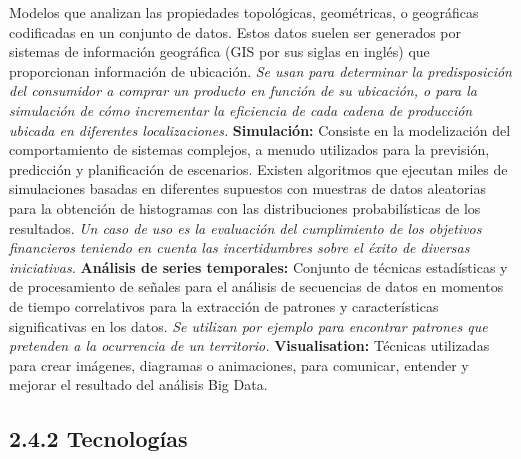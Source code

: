 \documentclass[
  letterpaper,
  DIV=11,
  numbers=noendperiod]{scrreprt}
\begin{document}
Modelos que analizan las propiedades topológicas, geométricas, o
geográficas codificadas en un conjunto de datos. Estos datos suelen ser
generados por sistemas de información geográfica (GIS por sus siglas en
inglés) que proporcionan información de ubicación. \emph{Se usan para
determinar la predisposición del consumidor a comprar un producto en
función de su ubicación, o para la simulación de cómo incrementar la
eficiencia de cada cadena de producción ubicada en diferentes
localizaciones.} \textbf{Simulación:} Consiste en la modelización del
comportamiento de sistemas complejos, a menudo utilizados para la
previsión, predicción y planificación de escenarios. Existen algoritmos
que ejecutan miles de simulaciones basadas en diferentes supuestos con
muestras de datos aleatorias para la obtención de histogramas con las
distribuciones probabilísticas de los resultados. \emph{Un caso de uso
es la evaluación del cumplimiento de los objetivos financieros teniendo
en cuenta las incertidumbres sobre el éxito de diversas iniciativas.}
\textbf{Análisis de series temporales:} Conjunto de técnicas
estadísticas y de procesamiento de señales para el análisis de
secuencias de datos en momentos de tiempo correlativos para la
extracción de patrones y características significativas en los datos.
\emph{Se utilizan por ejemplo para encontrar patrones que pretenden a la
ocurrencia de un territorio.} \textbf{Visualisation:} Técnicas
utilizadas para crear imágenes, diagramas o animaciones, para comunicar,
entender y mejorar el resultado del análisis Big Data.

\hypertarget{tecnologuxedas}{%
\subsection{2.4.2 Tecnologías}\label{tecnologuxedas}}
\end{document}
